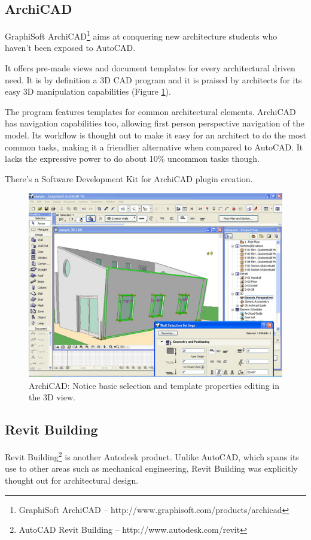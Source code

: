 \subsection{ArchiCAD}
\nocite{SITE-ARCHICAD}
GraphiSoft ArchiCAD\footnote{GraphiSoft ArchiCAD -- http://www.graphisoft.com/products/archicad}
aims at conquering new architecture students who haven't been exposed to AutoCAD.

It offers pre-made views and document templates for every architectural driven need.
It is by definition a 3D CAD program and it is praised by architects for its easy 3D
manipulation capabilities (Figure \ref{FIG-ARCHICAD}).

The program features templates for common architectural elements.
ArchiCAD has navigation capabilities too, allowing first person perspective navigation of the model.
Its workflow is thought out to make it easy for an architect to do the most common tasks,
making it a friendlier alternative when compared to AutoCAD.
It lacks the expressive power to do about 10\% uncommon tasks though.

There's a Software Development Kit for ArchiCAD plugin creation.

\begin{figure}[!ht]
    \centering
    \includegraphics[width=12cm]{gfx/archicad-1.png}
    \caption{ArchiCAD: Notice basic selection and template properties editing in the 3D view.}
    \label{FIG-ARCHICAD}
\end{figure}

\subsection{Revit Building}
\nocite{SITE-REVIT}
Revit Building\footnote{AutoCAD Revit Building -- http://www.autodesk.com/revit}
is another Autodesk product.
Unlike AutoCAD, which spans its use to other areas such as mechanical engineering,
Revit Building was explicitly thought out for architectural design.

